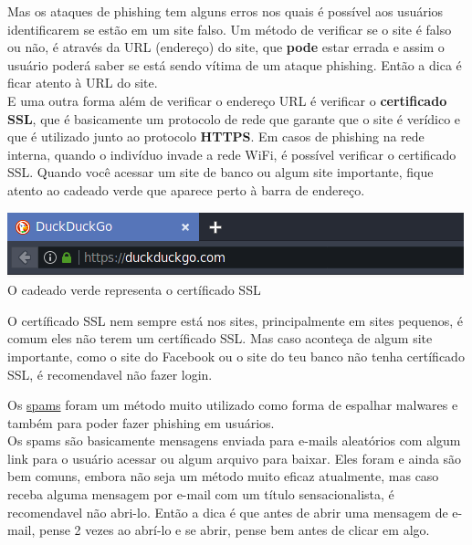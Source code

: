 \documentclass[12pt, letterpaper]{report}
\begin{document}
	Mas os ataques de phishing tem alguns erros nos quais é possível aos usuários identificarem se estão em um site falso. Um método de verificar se o site é falso ou não, é através da URL (endereço) do site, que \textbf{pode} estar errada e assim o usuário poderá saber se está sendo vítima de um ataque phishing. Então a dica é ficar atento à URL do site.\\

	E uma outra forma além de verificar o endereço URL é verificar o \textbf{certificado SSL}, que é basicamente um protocolo de rede que garante que o site é verídico e que é utilizado junto ao protocolo \textbf{HTTPS}. Em casos de phishing na rede interna, quando o indivíduo invade a rede WiFi, é possível verificar o certificado SSL. Quando você acessar um site de banco ou algum site importante, fique atento ao cadeado verde que aparece perto à barra de endereço.

	\begin{center} %
		\includegraphics[scale=1]{Duck.png}\\
		\footnotesize O cadeado verde representa o certíficado SSL
	\end{center}

	O certíficado SSL nem sempre está nos sites, principalmente em sites pequenos, é comum eles não terem um certíficado SSL. Mas caso aconteça de algum site importante, como o site do Facebook ou o site do teu banco não tenha certíficado SSL, é recomendavel não fazer login.\\

\pagebreak

	Os \href{https://criptowiki.miraheze.org/wiki/Spam}{spams} foram um método muito utilizado como forma de espalhar malwares e também para poder fazer phishing em usuários.\\

	Os spams são basicamente mensagens enviada para e-mails aleatórios com algum link para o usuário acessar ou algum arquivo para baixar. Eles foram e ainda são bem comuns, embora não seja um método muito eficaz atualmente, mas caso receba alguma mensagem por e-mail com um título sensacionalista, é recomendavel não abri-lo. Então a dica é que antes de abrir uma mensagem de e-mail, pense 2 vezes ao abrí-lo e se abrir, pense bem antes de clicar em algo.\\
\end{document}
